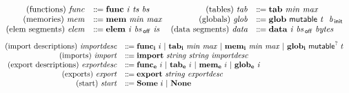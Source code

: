 \documentclass{standalone}
\begin{document}
\[
%
  \begin{array}{rl}
    \text{(functions)} ~ \V{func} &\dotdoteq \KK{func}~\V{i}~\V{ts}~\V{bs}\\
    \text{(memories)} ~ \V{mem} &\dotdoteq \KK{mem}~\V{min}~\V{max}\\
    \text{(elem segments)} ~ \V{elem} &\dotdoteq \KK{elem}~\V{i}~\V{bs}_\mathsf{\,off}~\V{is}
  \end{array}
  \begin{array}{rl}
    \text{(tables)} ~ \V{tab} &\dotdoteq \KK{tab}~\V{min}~\V{max}\\
    \text{(globals)} ~ \V{glob} &\dotdoteq \KK{glob}~\textsf{mutable}~\V{t}~~\V{b}_\mathsf{\,init}\\
    \text{(data segments)} ~ \textit{data} &\dotdoteq \KK{data}~\V{i}~\V{bs}_\mathsf{\,off}~\V{bytes}
  \end{array}
\]
\[
  \begin{array}{rl}
    \text{(import descriptions)}~\V{importdesc} &\dotdoteq \KK{func_i}~i~|~\KK{tab_i}~\V{min}~\V{max}~|~\KK{mem_i}~\V{min}~\V{max}~|~\KK{glob_i}~\textsf{mutable}^{?}~t\\
    \text{(imports)} ~ \V{import} &\dotdoteq \KK{import}~\V{string}~\V{string}~\V{importdesc}\\
    \text{(export descriptions)} ~ \V{exportdesc} &\dotdoteq \KK{func_e}~i~|~\KK{tab_e}~i~|~ \KK{mem_e}~i~|~\KK{glob_e}~\V{i}\\
    \text{(exports)}~\V{export} &\dotdoteq \KK{export}~\V{string}~\V{exportdesc}\\
    \text{(start)}~\V{start} &\dotdoteq \KK{Some}~i~|~\KK{None}
  \end{array}
\]
\end{document}
